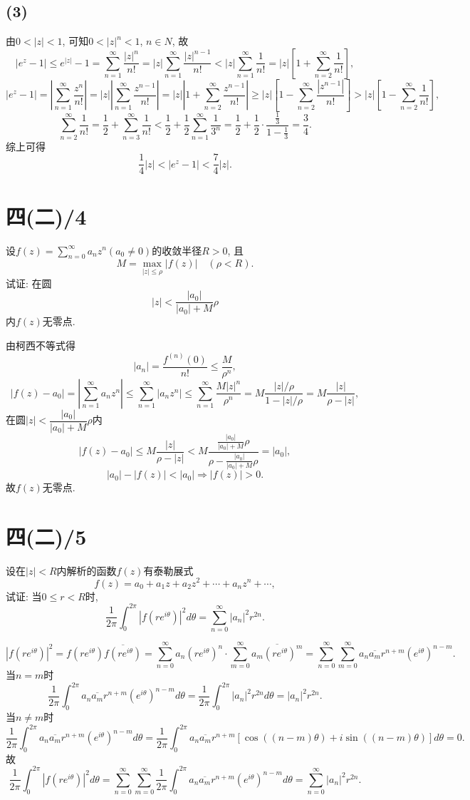 \documentclass[11pt,a4paper]{article}
\begin{document}
\subsection*{(3)}
由$0<|z|<1$, 可知$0<|z|^n<1$, $n\in N$, 故
$$|e^z-1|\leqslant e^{|z|}-1 =\sum_{n=1}^\infty\frac{|z|^n}{n!}= |z|\sum_{n=1}^\infty\frac{|z|^{n-1}}{n!}<|z|\sum_{n=1}^\infty\frac{1}{n!}=|z|\left[1+\sum_{n=2}^\infty\frac{1}{n!}\right],$$
$$|e^z-1|=\left|\sum_{n=1}^\infty\frac{z^n}{n!}\right|=|z|\left|\sum_{n=1}^\infty\frac{z^{n-1}}{n!}\right|=|z|\left|1+\sum_{n=2}^\infty\frac{z^{n-1}}{n!}\right|\geqslant|z|\left[1-\sum_{n=2}^\infty\frac{|z^{n-1}|}{n!}\right]>|z|\left[1-\sum_{n=2}^\infty\frac{1}{n!}\right],$$
$$\sum_{n=2}^\infty\frac{1}{n!}=\frac{1}{2}+\sum_{n=3}^\infty\frac{1}{n!}<\frac{1}{2}+\frac{1}{2}\sum_{n=1}^\infty\frac{1}{3^n}=\frac{1}{2}+\frac{1}{2}\cdot\frac{\frac{1}{3}}{1-\frac{1}{3}}=\frac{3}{4}.$$
综上可得
$$\frac{1}{4}|z|<|e^z-1|<\frac{7}{4}|z|.$$

\section{四(二)/4}
\begin{problem}
设$f(z)=\sum\limits_{n=0}^\infty a_nz^n(a_0\neq0)$的收敛半径$R>0$, 且$$M=\max_{|z|\leqslant\rho}|f(z)|\quad(\rho<R).$$
试证: 在圆$$|z|<\frac{|a_0|}{|a_0|+M}\rho$$内$f(z)$无零点.
\end{problem}

由柯西不等式得
$$|a_n|=\frac{f^{(n)}(0)}{n!}\leqslant\frac{M}{\rho^n},$$
$$|f(z)-a_0|=\left|\sum_{n=1}^\infty a_nz^n\right|\leqslant\sum_{n=1}^\infty|a_nz^n|\leqslant\sum_{n=1}^\infty\frac{M|z|^n}{\rho^n}=M\frac{|z|/\rho}{1-|z|/\rho}=M\frac{|z|}{\rho-|z|},$$
在圆$|z|<\dfrac{|a_0|}{|a_0|+M}\rho$内
$$|f(z)-a_0|\leqslant M\frac{|z|}{\rho-|z|}<M\frac{\frac{|a_0|}{|a_0|+M}\rho}{\rho-\frac{|a_0|}{|a_0|+M}\rho}=|a_0|,$$
$$|a_0|-|f(z)|<|a_0|\Longrightarrow |f(z)|>0.$$
故$f(z)$无零点.

\section{四(二)/5}
\begin{problem}
设在$|z|<R$内解析的函数$f(z)$有泰勒展式
$$f(z)=a_0+a_1z+a_2z^2+\cdots+a_nz^n+\cdots,$$
试证: 当$0\leqslant r<R$时,
$$\frac{1}{2\pi}\int_0^{2\pi}|f(re^{i\theta})|^2d\theta=\sum_{n=0}^\infty|a_n|^2r^{2n}.$$
\end{problem}
$$|f(re^{i\theta})|^2=f(re^{i\theta})\overline{f(re^{i\theta})}=\sum_{n=0}^\infty a_n(re^{i\theta})^{n}\cdot\sum_{m=0}^\infty\overline{a_m(re^{i\theta})^{m}}=\sum_{n=0}^\infty\sum_{m=0}^\infty a_n\overline{a_m}r^{n+m}(e^{i\theta})^{n-m}.$$
当$n=m$时
$$\frac{1}{2\pi}\int_0^{2\pi}a_n\overline{a_m}r^{n+m}(e^{i\theta})^{n-m}d\theta=\frac{1}{2\pi}\int_0^{2\pi}|a_n|^2r^{2n}d\theta=|a_n|^2r^{2n}.$$
当$n\neq m$时
$$\frac{1}{2\pi}\int_0^{2\pi}a_n\overline{a_m}r^{n+m}(e^{i\theta})^{n-m}d\theta=\frac{1}{2\pi}\int_0^{2\pi}a_n\overline{a_m}r^{n+m}\left[\cos((n-m)\theta)+i\sin((n-m)\theta)\right]d\theta=0.$$
故
$$\frac{1}{2\pi}\int_0^{2\pi}|f(re^{i\theta})|^2d\theta=\sum_{n=0}^\infty\sum_{m=0}^\infty \frac{1}{2\pi}\int_0^{2\pi}a_n\overline{a_m}r^{n+m}(e^{i\theta})^{n-m}d\theta=\sum_{n=0}^\infty |a_n|^2r^{2n}.$$
\end{document}
